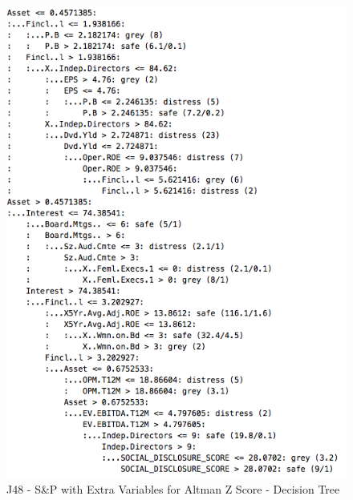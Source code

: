 \begin{figure}[h!]\label{sampleDT}
\centering
\includegraphics[scale=0.55]{images/sampleDT}
\caption{J48 - S\&P with Extra Variables for Altman Z Score - Decision Tree}
\end{figure}




\clearpage
